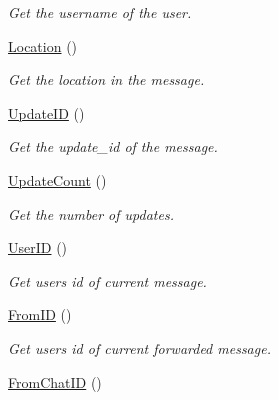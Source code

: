 \begin{DoxyCompactItemize}
\begin{DoxyCompactList}\small\item\em Get the username of the user. \end{DoxyCompactList}\item 
\hypertarget{class_telegram_aae456ae24175445c9c797b0d58d5716b}{}\hyperlink{class_telegram_aae456ae24175445c9c797b0d58d5716b}{Location} ()\label{class_telegram_aae456ae24175445c9c797b0d58d5716b}

\begin{DoxyCompactList}\small\item\em Get the location in the message. \end{DoxyCompactList}\item 
\hypertarget{class_telegram_a596f610d501cd48e6c20ec65dd9c3b34}{}\hyperlink{class_telegram_a596f610d501cd48e6c20ec65dd9c3b34}{Update\+I\+D} ()\label{class_telegram_a596f610d501cd48e6c20ec65dd9c3b34}

\begin{DoxyCompactList}\small\item\em Get the update\+\_\+id of the message. \end{DoxyCompactList}\item 
\hypertarget{class_telegram_a330b2888bb21d6c182534021a797103b}{}\hyperlink{class_telegram_a330b2888bb21d6c182534021a797103b}{Update\+Count} ()\label{class_telegram_a330b2888bb21d6c182534021a797103b}

\begin{DoxyCompactList}\small\item\em Get the number of updates. \end{DoxyCompactList}\item 
\hypertarget{class_telegram_afb1da9eb82ceca0b78cbba8e35e3fec8}{}\hyperlink{class_telegram_afb1da9eb82ceca0b78cbba8e35e3fec8}{User\+I\+D} ()\label{class_telegram_afb1da9eb82ceca0b78cbba8e35e3fec8}

\begin{DoxyCompactList}\small\item\em Get user\textquotesingle{}s id of current message. \end{DoxyCompactList}\item 
\hypertarget{class_telegram_af9d816f01fd16f3ace634023f8320aad}{}\hyperlink{class_telegram_af9d816f01fd16f3ace634023f8320aad}{From\+I\+D} ()\label{class_telegram_af9d816f01fd16f3ace634023f8320aad}

\begin{DoxyCompactList}\small\item\em Get user\textquotesingle{}s id of current forwarded message. \end{DoxyCompactList}\item 
\hypertarget{class_telegram_a4974bfd879b102b7bff6b69e14673b56}{}\hyperlink{class_telegram_a4974bfd879b102b7bff6b69e14673b56}{From\+Chat\+I\+D} ()\label{class_telegram_a4974bfd879b102b7bff6b69e14673b56}


\end{DoxyCompactItemize}
